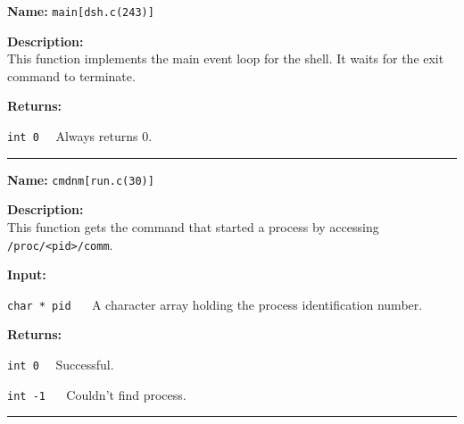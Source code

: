 \documentclass[11pt,a4paper]{article}
\begin{document}
\begin{description}
\item \textbf{Name:} 
\verb|main[dsh.c(243)]|

\item \textbf{Description:}\\
This function implements the main event loop for the shell. It waits for the exit command to terminate.

\item \textbf{Returns:}
\begin{description}
\item \verb|int 0|~~ Always returns 0.
\end{description}
\end{description}\hrule

\pagebreak
\begin{description}
\item \textbf{Name:} 
\verb|cmdnm[run.c(30)]|

\item \textbf{Description:}\\
This function gets the command that started a process by accessing \verb|/proc/<pid>/comm|.

\item \textbf{Input:}
\begin{description}
\item \verb|char * pid| ~~ A character array holding the process identification number.
\end{description}

\item \textbf{Returns:}
\begin{description}
\item \verb|int 0|~~ Successful.
\item \verb|int -1| ~~ Couldn't find process.
\end{description}
\end{description}\hrule
\end{document}
